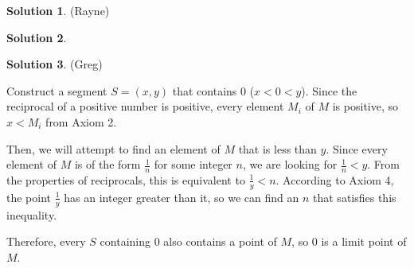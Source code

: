 \documentclass{article}
\theoremstyle{definition}
\newtheorem{solution}{Solution}
\begin{document}
\begin{solution} %
(Rayne)
\end{solution}

\begin{solution} %
\end{solution}

\begin{solution} %
(Greg)

Construct a segment $S = (x, y)$ that contains $0$ ($x < 0 < y$).
Since the reciprocal of a positive number is positive, every element $M_i$ of $M$ is positive, so $x < M_i$ from Axiom 2.

Then, we will attempt to find an element of $M$ that is less than $y$.
Since every element of $M$ is of the form $\frac{1}{n}$ for some integer $n$, we are looking for $\frac{1}{n} < y$.
From the properties of reciprocals, this is equivalent to $\frac{1}{y} < n$.
According to Axiom 4, the point $\frac{1}{y}$ has an integer greater than it, so we can find an $n$ that satisfies this inequality.

Therefore, every $S$ containing $0$ also contains a point of $M$, so $0$ is a limit point of $M$.
\end{solution}
\end{document}
